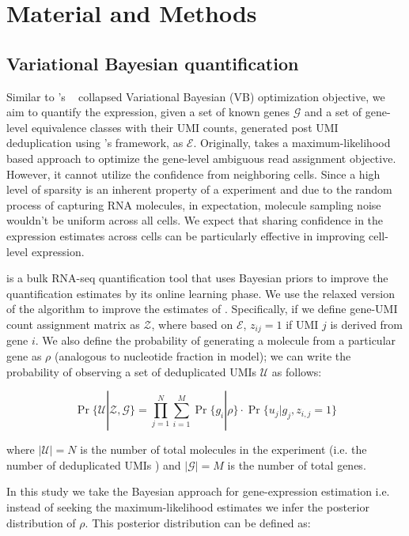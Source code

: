 \section{Material and Methods}
\label{sec:alv2_methods}

\subsection{Variational Bayesian \dscrnaseq quantification}
Similar to \salmon 's ~\citep{salmon} collapsed Variational Bayesian (VB) optimization 
objective, we aim to quantify the expression, given a set of known genes $\mathcal{G}$ and a set
of gene-level equivalence classes with their UMI counts, generated post UMI deduplication using \alevin 's 
framework, as $\mathcal{E}$. Originally, \alevin takes a maximum-likelihood based approach to 
optimize the gene-level ambiguous read assignment objective. However, it cannot utilize the 
confidence from neighboring cells. Since a high level of sparsity is an inherent property of a \dscrnaseq
experiment and due to the random process of capturing RNA molecules, in expectation, molecule 
sampling noise wouldn't be uniform across all cells. We expect that sharing confidence in 
the expression estimates across cells can be particularly effective in improving cell-level expression. 

\salmon is a bulk RNA-seq quantification tool that uses Bayesian priors to improve the 
quantification estimates by its online learning phase. We use the relaxed version of the algorithm 
to improve the estimates of \alevin. Specifically, if we define gene-UMI count 
assignment matrix as $\mathcal{Z}$, where based on $\mathcal{E}$, $z_{ij}=1$ if UMI $j$ is derived from 
gene $i$. We also define the probability of generating a molecule from a particular gene as $\rho$ (analogous to 
nucleotide fraction in \salmon model); we can write the probability of observing a set of deduplicated 
UMIs $\mathcal{U}$ as follows:

\begin{equation}
    \Pr\{\mathcal{U} | \mathcal{Z},\mathcal{G}\} = 
    \prod_{j=1}^{N}\sum_{i=1}^{M}\Pr\{ g_i | \rho \} \cdot \Pr\{ u_j | g_j, z_{i,j} = 1 \}
\end{equation}
 
 where $|\mathcal{U}| = N$ is the number of total molecules in the experiment (i.e. the number of 
 deduplicated UMIs ) and $|\mathcal{G}| = M$ is the number of total genes.
 
In this study we take the Bayesian approach for gene-expression estimation i.e. instead of 
seeking the maximum-likelihood estimates we infer the posterior distribution of $\rho$. 
This posterior distribution can be defined as:

